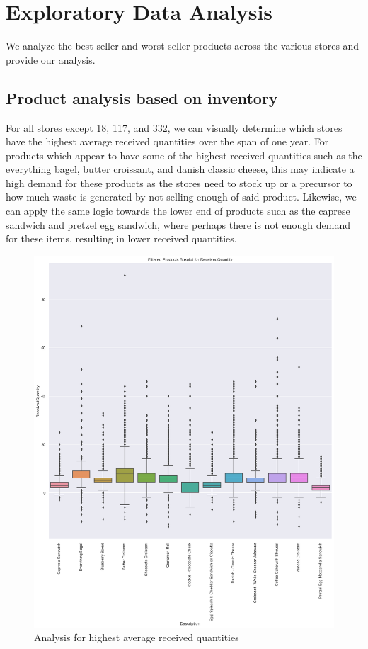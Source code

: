 \section{Exploratory Data Analysis}
We analyze the best seller and worst seller products across the various stores and provide our analysis. 
\subsection{Product analysis based on inventory}
For all stores except 18, 117, and 332, we can visually determine which stores have the highest average received quantities over the span of one year. For products which appear to have some of the highest received quantities such as the everything bagel, butter croissant, and danish classic cheese, this may indicate a high demand for these products as the stores need to stock up or a precursor to how much waste is generated by not selling enough of said product. Likewise, we can apply the same logic towards the lower end of products such as the caprese sandwich and pretzel egg sandwich, where perhaps there is not enough demand for these items, resulting in lower received quantities. 

\begin{figure}[ht]
    \centering
    \includegraphics[width = 0.7\linewidth]{figures/figure1.png}
    \caption{Analysis for highest average received quantities }
\end{figure}

